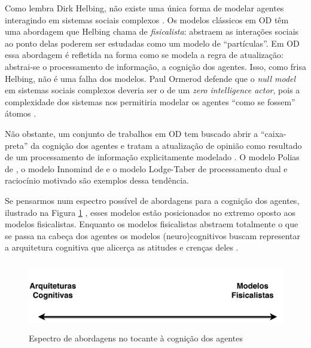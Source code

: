 Como lembra Dirk Helbing, não existe uma única forma de modelar agentes
interagindo em sistemas sociais complexos \cite{helbing2010pluralistic}. Os
modelos clássicos em OD têm uma abordagem que Helbing chama de
\textit{fisicalista}: abstraem as interações sociais ao ponto delas poderem ser
estudadas como um modelo de ``partículas''. Em OD essa abordagem é refletida na
forma como se modela a regra de atualização: abstrai-se o processamento de
informação, a cognição dos agentes. Isso, como frisa Helbing, não é uma falha
dos modelos. Paul Ormerod defende que o \textit{null model} em sistemas sociais
complexos deveria ser o de um \textit{zero intelligence actor}, pois a
complexidade dos sistemas nos permitiria modelar os agentes ``como se fossem''
átomos \cite{ormerod2008can, bentley2012agents}.

Não obstante, um conjunto de trabalhos em OD tem buscado abrir a ``caixa-preta''
da cognição dos agentes e tratam a atualização de opinião como resultado de um
processamento de informação explicitamente modelado \cite{flache2017,
  jager2017}. O modelo Polias de , o modelo
Innomind de  e o modelo Lodge-Taber
\cite{kim2010computational,kim2011model} de processamento dual e raciocínio
motivado são exemplos dessa tendência.

Se pensarmos num espectro possível de abordagens para a cognição dos agentes,
ilustrado na Figura \ref{fig4} , esses modelos estão posicionados no extremo oposto aos
modelos fisicalistas. Enquanto os modelos fisicalistas abstraem totalmente o que
se passa na cabeça dos agentes os modelos (neuro)cognitivos buscam representar a
arquitetura cognitiva que alicerça as atitudes e crenças
deles \cite{kim2010computational}.

\begin{figure}[H]
  \centering
  \includegraphics[width = \textwidth, height = 3cm]{ims/line.pdf}
  \caption{Espectro de abordagens no tocante à cognição dos agentes}
  \label{fig4}
\end{figure}

